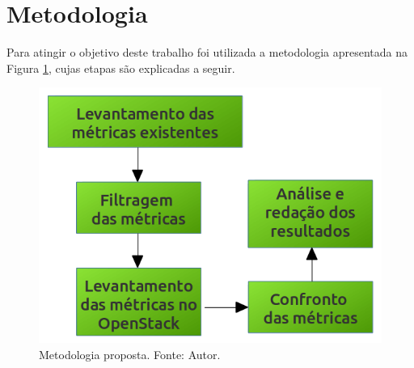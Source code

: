 \documentclass[conference]{IEEEtran}
\begin{document}
\section{Metodologia}

Para atingir o objetivo deste trabalho foi utilizada a metodologia apresentada na Figura \ref{metodologia},
cujas etapas são explicadas a seguir.


\begin{figure}[ht]
  \centering
  \includegraphics[width=.3\textwidth]{figuras/metodologia.png}
  \caption{Metodologia proposta. Fonte: Autor.}
  \label{metodologia}
\end{figure}
\end{document}
